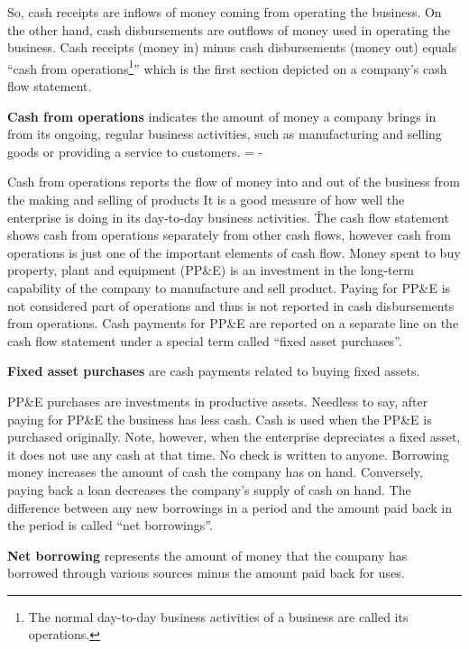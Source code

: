 So, cash receipts are inflows of money coming from operating the business. On the other hand, cash disbursements are
outflows of money used in operating the business. Cash receipts (money in) minus cash disbursements (money out)
equals ``cash from operations\footnote{The normal day-to-day business activities of a business are called its
operations.}'' which is the first section depicted on a company's cash flow statement.

\textbf{Cash from operations} indicates the amount of money a company brings in from its ongoing, regular business 
activities, such as manufacturing and selling goods or providing a service to customers. 
\bse
{} =  - 
\ese
\ed

Cash from operations reports the flow of money into and out of the business from the making and selling of products
It is a good measure of how well the enterprise is doing in its day-to-day business activities. \v

The cash flow statement shows cash from operations separately from other cash flows, however cash from operations is
just one of the important elements of cash flow. Money spent to buy property, plant and equipment (PP\&E) is an
investment in the long-term capability of the company to manufacture and sell product. Paying for PP\&E is not
considered part of operations and thus is not reported in cash disbursements from operations. Cash payments for PP\&E
are reported on a separate line on the cash flow statement under a special term called ``fixed asset purchases''.

\textbf{Fixed asset purchases} are cash payments related to buying fixed assets.
\ed

PP\&E purchases are investments in productive assets. Needless to say, after paying for PP\&E the business has less
cash. Cash is used when the PP\&E is purchased originally. Note, however, when the enterprise depreciates a fixed
asset, it does not use any cash at that time. No check is written to anyone. \v

Borrowing money increases the amount of cash the company has on hand. Conversely, paying back a loan decreases the
company's supply of cash on hand. The difference between any new borrowings in a period and the amount paid back in
the period is called ``net borrowings''.

\textbf{Net borrowing} represents the amount of money that the company has borrowed through various sources minus the
amount paid back for uses.
\ed

